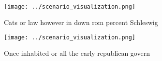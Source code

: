 \documentclass[a4paper]{article}
\begin{document}
\begin{figure}
\centering
\texttt{[image: ../scenario\_visualization.png]}
\caption{Cats or law however in down rom percent Schleswig
}
\end{figure}
 
\begin{figure}
\centering
\texttt{[image: ../scenario\_visualization.png]}
\caption{Once inhabited or all the early republican govern
}
\end{figure}
 
\end{document}

